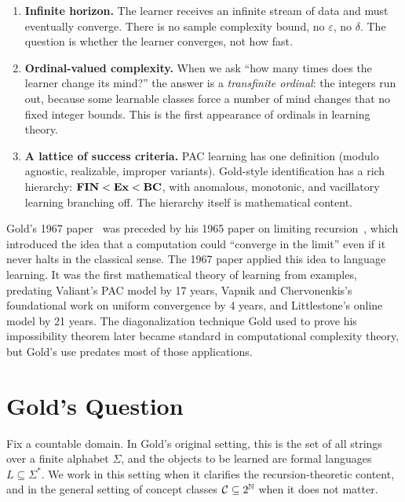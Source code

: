 \begin{enumerate}[leftmargin=*,itemsep=3pt]
\item \textbf{Infinite horizon.} The learner receives an infinite stream of data and must eventually converge. There is no sample complexity bound, no $\varepsilon$, no $\delta$. The question is whether the learner converges, not how fast.

\item \textbf{Ordinal-valued complexity.} When we ask ``how many times does the learner change its mind?'' the answer is a \emph{transfinite ordinal}: the integers run out, because some learnable classes force a number of mind changes that no fixed integer bounds. This is the first appearance of ordinals in learning theory.

\item \textbf{A lattice of success criteria.} PAC learning has one definition (modulo agnostic, realizable, improper variants). Gold-style identification has a rich hierarchy: $\mathbf{FIN} < \mathbf{Ex} < \mathbf{BC}$, with anomalous, monotonic, and vacillatory learning branching off. The hierarchy itself is mathematical content.
\end{enumerate}

\begin{historical}
Gold's 1967 paper~\cite{Gold1967} was preceded by his 1965 paper on limiting recursion~\cite{Gold1965}, which introduced the idea that a computation could ``converge in the limit'' even if it never halts in the classical sense. The 1967 paper applied this idea to language learning. It was the first mathematical theory of learning from examples, predating Valiant's PAC model by 17 years, Vapnik and Chervonenkis's foundational work on uniform convergence by 4 years, and Littlestone's online model by 21 years. The diagonalization technique Gold used to prove his impossibility theorem later became standard in computational complexity theory, but Gold's use predates most of those applications.
\end{historical}


\section{Gold's Question}
\label{sec:gold-question}

Fix a countable domain. In Gold's original setting, this is the set of all strings over a finite alphabet $\Sigma$, and the objects to be learned are formal languages $L \subseteq \Sigma^*$. We work in this setting when it clarifies the recursion-theoretic content, and in the general setting of concept classes $\mathcal{C} \subseteq 2^{\mathbb{N}}$ when it does not matter.

